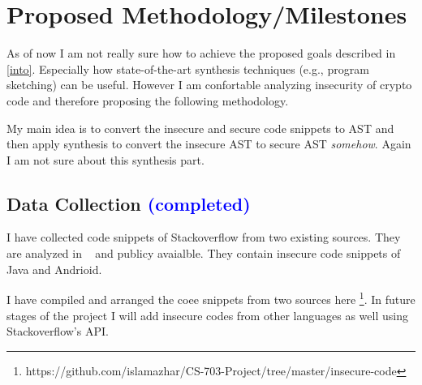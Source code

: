 \documentclass[sigconf]{acmart}
\begin{document}
\section{Proposed Methodology/Milestones}
As of now I am not really sure how to achieve the proposed goals described in \cref{into}. Especially how state-of-the-art synthesis techniques (e.g., program sketching) can be useful. However I am confortable analyzing insecurity of crypto code and therefore proposing the following methodology. 

My main idea is to convert the insecure and secure code snippets to AST and then apply synthesis to convert the insecure AST to secure AST \textit{somehow}. Again I am not sure about this synthesis part.  

\subsection{Data Collection \textcolor{blue}{(completed)}} 
I have collected code snippets of Stackoverflow from two existing sources. They are analyzed in ~\cite{fischer2017stack, meng2018secure} and publicy avaialble. 
They contain insecure code snippets of Java and Andrioid. 

I have compiled and arranged the coee snippets from two sources here \footnote{https://github.com/islamazhar/CS-703-Project/tree/master/insecure-code}. In future stages of the project I will add insecure codes from other languages as well using Stackoverflow's API.
\end{document}
